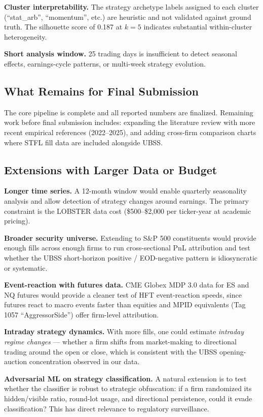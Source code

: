 \documentclass[11pt, letterpaper]{article}
\begin{document}
\textbf{Cluster interpretability.}
The strategy archetype labels assigned to each cluster (``stat\_arb'',
``momentum'', etc.) are heuristic and not validated against ground truth.
The silhouette score of 0.187 at $k=5$ indicates substantial within-cluster
heterogeneity.

\textbf{Short analysis window.}
25 trading days is insufficient to detect seasonal effects, earnings-cycle
patterns, or multi-week strategy evolution.

\subsection{What Remains for Final Submission}

The core pipeline is complete and all reported numbers are finalized.
Remaining work before final submission includes: expanding the literature
review with more recent empirical references (2022--2025), and adding
cross-firm comparison charts where STFL fill data are included alongside
UBSS.

\subsection{Extensions with Larger Data or Budget}

\textbf{Longer time series.}
A 12-month window would enable quarterly seasonality analysis and allow
detection of strategy changes around earnings.
The primary constraint is the LOBSTER data cost (\$500--\$2,000 per
ticker-year at academic pricing).

\textbf{Broader security universe.}
Extending to S\&P 500 constituents would provide enough fills across enough
firms to run cross-sectional PnL attribution and test whether the UBSS
short-horizon positive / EOD-negative pattern is idiosyncratic or systematic.

\textbf{Event-reaction with futures data.}
CME Globex MDP 3.0 data for ES and NQ futures would provide a cleaner test of
HFT event-reaction speeds, since futures react to macro events faster than
equities and MPID equivalents (Tag 1057 ``AggressorSide'') offer firm-level
attribution.

\textbf{Intraday strategy dynamics.}
With more fills, one could estimate \textit{intraday regime changes} ---
whether a firm shifts from market-making to directional trading around the open
or close, which is consistent with the UBSS opening-auction concentration
observed in our data.

\textbf{Adversarial ML on strategy classification.}
A natural extension is to test whether the classifier is robust to strategic
obfuscation: if a firm randomized its hidden/visible ratio, round-lot usage,
and directional persistence, could it evade classification?
This has direct relevance to regulatory surveillance.
\end{document}
